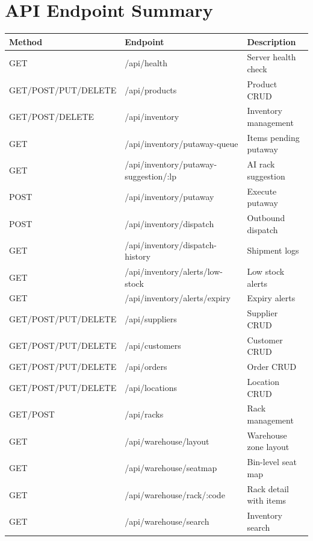 \documentclass[12pt,a4paper]{report}
\begin{document}
\section{API Endpoint Summary}
\begin{table}[H]
    \centering
    \renewcommand{\arraystretch}{1.2}
    \begin{tabularx}{\textwidth}{|l|l|X|}
        \hline
        \textbf{Method} & \textbf{Endpoint} & \textbf{Description} \\
        \hline
        GET & /api/health & Server health check \\
        \hline
        GET/POST/PUT/DELETE & /api/products & Product CRUD \\
        \hline
        GET/POST/DELETE & /api/inventory & Inventory management \\
        \hline
        GET & /api/inventory/putaway-queue & Items pending putaway \\
        \hline
        GET & /api/inventory/putaway-suggestion/:lp & AI rack suggestion \\
        \hline
        POST & /api/inventory/putaway & Execute putaway \\
        \hline
        POST & /api/inventory/dispatch & Outbound dispatch \\
        \hline
        GET & /api/inventory/dispatch-history & Shipment logs \\
        \hline
        GET & /api/inventory/alerts/low-stock & Low stock alerts \\
        \hline
        GET & /api/inventory/alerts/expiry & Expiry alerts \\
        \hline
        GET/POST/PUT/DELETE & /api/suppliers & Supplier CRUD \\
        \hline
        GET/POST/PUT/DELETE & /api/customers & Customer CRUD \\
        \hline
        GET/POST/PUT/DELETE & /api/orders & Order CRUD \\
        \hline
        GET/POST/PUT/DELETE & /api/locations & Location CRUD \\
        \hline
        GET/POST & /api/racks & Rack management \\
        \hline
        GET & /api/warehouse/layout & Warehouse zone layout \\
        \hline
        GET & /api/warehouse/seatmap & Bin-level seat map \\
        \hline
        GET & /api/warehouse/rack/:code & Rack detail with items \\
        \hline
        GET & /api/warehouse/search & Inventory search \\
        \hline
    \end{tabularx}
\end{table}
\end{document}
